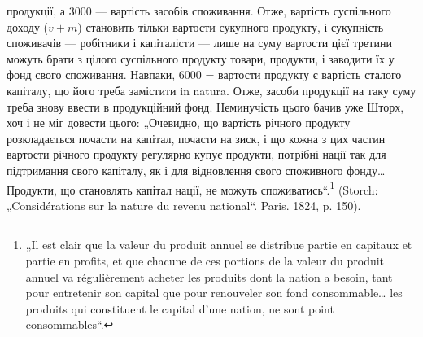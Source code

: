 \parcont{}  %
продукції, а 3000 — вартість засобів споживання. Отже, вартість суспільного
доходу ($v + m$) становить тільки  вартости сукупного продукту,
і сукупність споживачів — робітники і капіталісти — лише на суму вартости
цієї третини можуть брати з цілого суспільного продукту товари,
продукти, і заводити їх у фонд свого споживання. Навпаки, 6000 = 
вартости продукту є вартість сталого капіталу, що його треба замістити
in natura. Отже, засоби продукції на таку суму треба знову ввести в
продукційний фонд. Неминучість цього бачив уже Шторх, хоч і не міг
довести цього: „Очевидно, що вартість річного продукту розкладається
почасти на капітал, почасти на зиск, і що кожна з цих частин вартости річного
продукту регулярно купує продукти, потрібні нації так для підтримання
свого капіталу, як і для відновлення свого споживного фонду\dots{} Продукти,
що становлять капітал нації, не можуть споживатись“.\footnote*{
„Il est clair que la valeur du produit annuel se distribue partie en capitaux
et partie en profits, et que chacune de ces portions de la valeur du produit annuel
va régulièrement acheter les produits dont la nation a besoin, tant pour entretenir
son capital que pour renouveler son fond consommable\dots{} les produits qui constituent
le capital d’une nation, ne sont point consommables“.
} (Storch:
„Considérations sur la nature du revenu national“. Paris. 1824, p. 150).

